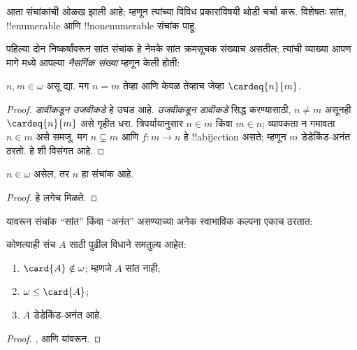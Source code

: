 \documentclass[../../../include/open-logic-section]{subfiles}
\begin{document}

आता संचांकांची ओळख झाली आहे; म्हणून त्यांच्या विविध प्रकारांविषयी थोडी चर्चा करू. विशेषतः सांत, !!{enumerable} आणि !!{nonenumerable} संचांक पाहू.

पहिल्या दोन निष्कर्षांवरून सांत संचांक हे नेमके सांत क्रमसूचक संख्याच असतील; त्यांची व्याख्या आपण मागे  मध्ये आपल्या \emph{नैसर्गिक संख्या} म्हणून केली होती:

\begin{prop}
$n, m \in \omega$ असू द्या. मग $n = m$ तेव्हा आणि केवळ तेव्हाच जेव्हा $\cardeq{n}{m}$.
\end{prop}

\begin{proof}
\emph{डावीकडून उजवीकडे} हे उघड आहे. \emph{उजवीकडून डावीकडे} सिद्ध करण्यासाठी, $n \neq m$ असूनही $\cardeq{n}{m}$ असे गृहीत धरा. त्रिपर्यायानुसार $n \in m$ किंवा $m \in n$; व्यापकता न गमावता $n \in m$ असे समजू. मग $n \subsetneq m$ आणि $f \colon m \to n$ हे !!a{bijection} असते; म्हणून $m$ डेडेकिंड-अनंत ठरतो. हे  शी विसंगत आहे.
\end{proof}

\begin{cor}
$n \in \omega$ असेल, तर $n$ हा संचांक आहे.
\end{cor}

\begin{proof}
हे लगेच मिळते.
\end{proof}
\noindent
यावरून संचांक “सांत” किंवा “अनंत” असण्याच्या अनेक स्वाभाविक कल्पना एकाच ठरतात:
\begin{thm}कोणत्याही संच $A$ साठी पुढील विधाने समतुल्य आहेत:
\begin{enumerate}
  \item{} $\card{A} \notin \omega$; म्हणजे
  $A$ सांत नाही;
  \item{} $\omega \leq \card{A}$;
  \item{} $A$ डेडेकिंड-अनंत आहे.
\end{enumerate}
\end{thm}

\begin{proof}
,
 आणि
 यांवरून.
\end{proof}
\end{document}
